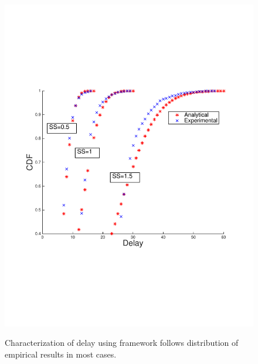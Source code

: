 \begin{figure}[]
{        \includegraphics[scale=0.40, clip=true, trim=12mm 65mm 20mm 65mm]{figures/delay_cdfs/delay_cdf_grid_half.pdf}
        \label{fig:delay_cdf_grid}
        }
   \caption{Characterization of delay using framework follows distribution of empirical results in most cases.}
   \label{fig:delay_cdf_anal_vs_sim}
   \vspace{-4mm}
\end{figure}
